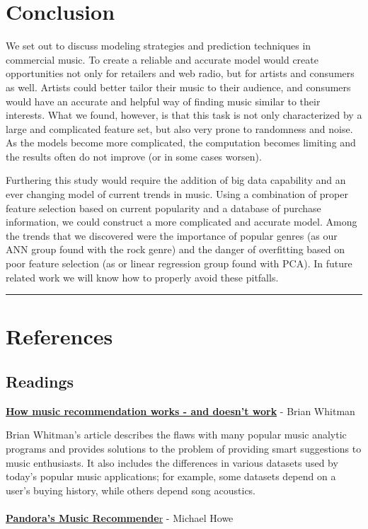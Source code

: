 \documentclass[12pt]{article}
\newcommand{\horizontalLine}{
	\begin{center}
		\hrule width 1.0\textwidth
	\end{center}
}
\begin{document}
\section{Conclusion}
\label{sec:conclusion}

We set out to discuss modeling strategies and prediction techniques in commercial music. To create a reliable and accurate model would create opportunities not only for retailers and web radio, but for artists and consumers as well. Artists could better tailor their music to their audience, and consumers would have an accurate and helpful way of finding music similar to their interests. What we found, however, is that this task is not only characterized by a large and complicated feature set, but also very prone to randomness and noise. As the models become more complicated, the computation becomes limiting and the results often do not improve (or in some cases worsen).

Furthering this study would require the addition of big data capability and an ever changing model of current trends in music. Using a combination of proper feature selection based on current popularity and a database of purchase information, we could construct a more complicated and accurate model. Among the trends that we discovered were the importance of popular genres (as our ANN group found with the rock genre) and the danger of overfitting based on poor feature selection (as or linear regression group found with PCA). In future related work we will know how to properly avoid these pitfalls.

\horizontalLine
\section{References}
\label{sec:references}

\subsection{Readings}
\label{subsec:readings}
\href{http://notes.variogr.am/post/37675885491/how-music-recommendation-works-and-doesnt-work}{\textbf{How music recommendation works - and doesn't work}} - Brian Whitman

Brian Whitman's article describes the flaws with many popular music analytic programs and provides solutions to the problem of providing smart suggestions to music enthusiasts. It also includes the differences in various datasets used by today's popular music applications; for example, some datasets depend on a user's buying history, while others depend song acoustics.
\\
\\
\href{http://courses.cs.washington.edu/courses/csep521/07wi/prj/michael.pdf}{\textbf{Pandora's Music Recommende}r} - Michael Howe 
\end{document}
